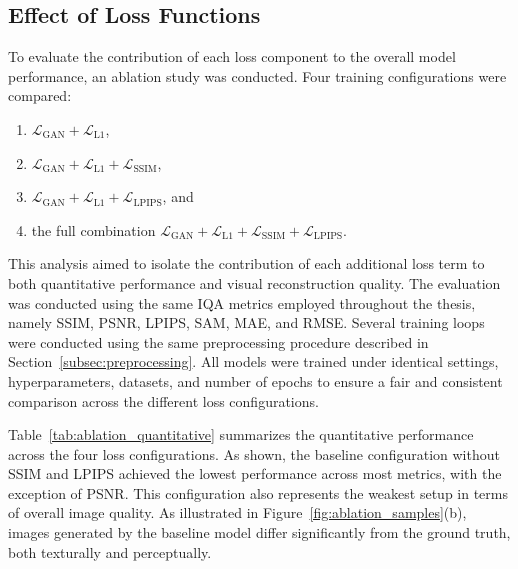 \subsection{Effect of Loss Functions}
\label{subsec:ablation_loss}

To evaluate the contribution of each loss component to the overall model performance, an ablation study was conducted. Four training configurations were compared:
\begin{enumerate}
    \item $\mathcal{L}_{\text{GAN}} + \mathcal{L}_{\text{L1}}$,
    \item $\mathcal{L}_{\text{GAN}} + \mathcal{L}_{\text{L1}} + \mathcal{L}_{\text{SSIM}}$,
    \item $\mathcal{L}_{\text{GAN}} + \mathcal{L}_{\text{L1}} + \mathcal{L}_{\text{LPIPS}}$, and
    \item the full combination $\mathcal{L}_{\text{GAN}} + \mathcal{L}_{\text{L1}} + \mathcal{L}_{\text{SSIM}} + \mathcal{L}_{\text{LPIPS}}$.
\end{enumerate}
This analysis aimed to isolate the contribution of each additional loss term to both quantitative performance and visual reconstruction quality. The evaluation was conducted using the same IQA metrics employed throughout the thesis, namely SSIM, PSNR, LPIPS, SAM, MAE, and RMSE. Several training loops were conducted using the same preprocessing procedure described in Section~\ref{subsec:preprocessing}. All models were trained under identical settings, hyperparameters, datasets, and number of epochs to ensure a fair and consistent comparison across the different loss configurations.

Table~\ref{tab:ablation_quantitative} summarizes the quantitative performance across the four loss configurations. As shown, the baseline configuration without SSIM and LPIPS achieved the lowest performance across most metrics, with the exception of PSNR. This configuration also represents the weakest setup in terms of overall image quality. As illustrated in Figure~\ref{fig:ablation_samples}(b), images generated by the baseline model differ significantly from the ground truth, both texturally and perceptually. 

